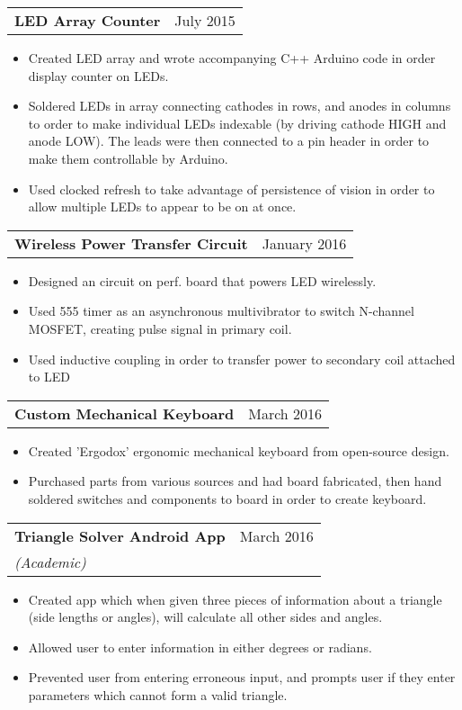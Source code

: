 \documentclass[letterpaper,10pt]{article}
\makeatletter
\newcommand{\resitem}[1]{\item #1 \vspace{-2pt}}
\newcommand{\resheading}[1]{{\large \parashade[.9]{sharpcorners}{\textbf{#1 \vphantom{p\^{E}}}}}}
\newcommand{\ressubheading}[4]{
    \begin{tabular*}{7in}{l@{\extracolsep{\fill}}r}
    		\textbf{#1} & #2 \\
    		\textit{#3} & \textit{#4} \\
    \end{tabular*}\vspace{-6pt}}
\newcommand{\resshortsubheading}[2]{
    \begin{tabular*}{7in}{l@{\extracolsep{\fill}}r}
        \textbf{#1} & #2 \\
    \end{tabular*}\vspace{-6pt}}
\makeatother
\begin{document}
\resheading{Projects}
\begin{samepage}
    \resshortsubheading{LED Array Counter}{July 2015}
    \begin{itemize}
        \resitem{Created LED array and wrote accompanying C++ Arduino code in order display counter on LEDs.}
        \resitem{Soldered LEDs in array connecting cathodes in rows, and anodes in columns to order to make individual LEDs indexable (by driving cathode HIGH and anode LOW). The leads were then connected to a pin header in order to make them controllable by Arduino.}
        \resitem{Used clocked refresh to take advantage of persistence of vision in order to allow multiple LEDs to appear to be on at once. }
    \end{itemize}   
\end{samepage}
\begin{samepage}
    \resshortsubheading{Wireless Power Transfer Circuit}{January 2016}
    \begin{itemize}
        \resitem{Designed an circuit on perf. board that powers LED wirelessly. }
        \resitem{Used 555 timer as an asynchronous multivibrator to switch N-channel MOSFET, creating pulse signal in primary coil. }
        \resitem{Used inductive coupling in order to transfer power to secondary coil attached to LED}
    \end{itemize}
\end{samepage}
\begin{samepage}
    \resshortsubheading{Custom Mechanical Keyboard}{March 2016}
    \begin{itemize}
        \resitem{Created 'Ergodox' ergonomic mechanical keyboard from open-source design.}
        \resitem{Purchased parts from various sources and had board fabricated, then hand soldered switches and components to board in order to create keyboard.}
    \end{itemize}
\end{samepage}
\begin{samepage}
    \ressubheading{Triangle Solver Android App}{March 2016}{(Academic)}{}
    \begin{itemize}
        \resitem{Created app which when given three pieces of information about a triangle (side lengths or angles), will calculate all other sides and angles.}
        \resitem{Allowed user to enter information in either degrees or radians.}
        \resitem{Prevented user from entering erroneous input, and prompts user if they enter parameters which cannot form a valid triangle.}
    \end{itemize} 
\end{samepage}
\end{document}
